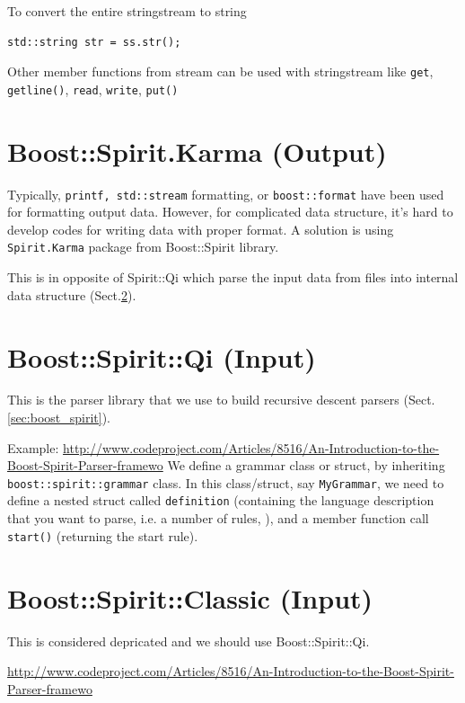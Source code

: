 To convert the entire stringstream to string
\begin{verbatim}
std::string str = ss.str();
\end{verbatim}


Other member functions from stream can be used with stringstream like
\verb!get!, \verb!getline()!, \verb!read!, \verb!write!, \verb!put()!


\section{Boost::Spirit.Karma (Output)}
\label{sec:boost_spirit_Karma}

Typically, \verb!printf, std::stream! formatting, or \verb!boost::format! have
been used for formatting output data. However, for complicated data structure,
it's hard to develop codes for writing data with proper format. A solution is
using \verb!Spirit.Karma! package from Boost::Spirit library. 


This is in opposite of Spirit::Qi which parse the input data from files into
internal data structure (Sect.\ref{sec:boost_spirit_Qi}).

\section{Boost::Spirit::Qi (Input)}
\label{sec:boost_spirit_Qi}

This is the parser library that we use to build recursive descent parsers
(Sect.\ref{sec:boost_spirit}).

Example:
\url{http://www.codeproject.com/Articles/8516/An-Introduction-to-the-Boost-Spirit-Parser-framewo}
We define a grammar class or struct, by inheriting \verb!boost::spirit::grammar!
class. In this class/struct, say \verb!MyGrammar!, we need to define a nested
struct called \verb!definition! (containing the language description that you
want to parse, i.e. a number of rules, ), and a member function call
\verb!start()! (returning the start rule).


\section{Boost::Spirit::Classic (Input)}
\label{sec:boost_spirit_classic}

This is considered depricated and we should use Boost::Spirit::Qi.

\url{http://www.codeproject.com/Articles/8516/An-Introduction-to-the-Boost-Spirit-Parser-framewo}

